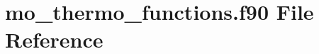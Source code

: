\hypertarget{mo__thermo__functions_8f90}{
\section{mo\_\-thermo\_\-functions.f90 File Reference}
\label{mo__thermo__functions_8f90}
}
